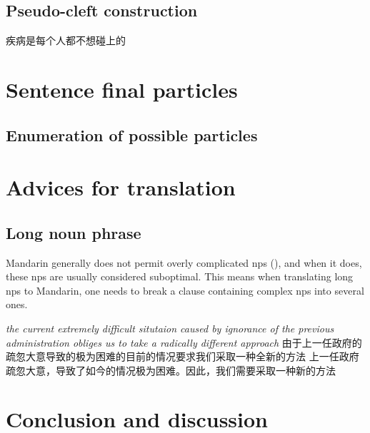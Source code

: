 \documentclass[UTF8, a4paper, oneside, scheme=plain, 12pt]{ctexrep}
\newcommand{\form}[1]{\emph{#1}}
\begin{document}
\section{Pseudo-cleft construction}

\begin{exe}
    \ex 疾病是每个人都不想碰上的
\end{exe}

\chapter{Sentence final particles}

\section{Enumeration of possible particles}\label{sec:sfp.all}

\chapter{Advices for translation}

\section{Long noun phrase}\label{sec:translation.long-noun-phrases}

Mandarin generally does not permit overly complicated \acp{np} (),
and when it does, these \acp{np} are usually considered suboptimal.
This means when translating long \acp{np} to Mandarin,
one needs to break a clause containing complex \acp{np} into several ones.

\begin{exe}
    \ex\begin{xlist}
        \ex \form{the current extremely difficult situtaion caused by ignorance of the previous administration obliges us to take a radically different approach}
        \ex 由于上一任政府的疏忽大意导致的极为困难的目前的情况要求我们采取一种全新的方法
        \ex 上一任政府疏忽大意，导致了如今的情况极为困难。因此，我们需要采取一种新的方法
    \end{xlist}
\end{exe}

\chapter{Conclusion and discussion}
\end{document}
